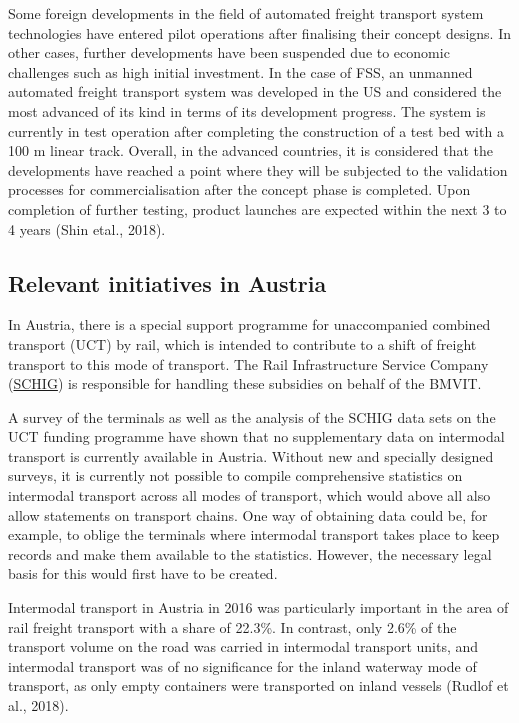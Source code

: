 \documentclass[
]{book}
\begin{document}
Some foreign developments in the field of automated freight transport system technologies have entered pilot operations after finalising their concept designs. In other cases, further developments have been suspended due to economic challenges such as high initial investment. In the case of FSS, an unmanned automated freight transport system was developed in the US and considered the most advanced of its kind in terms of its development progress. The system is currently in test operation after completing the construction of a test bed with a 100 m linear track. Overall, in the advanced countries, it is considered that the developments have reached a point where they will be subjected to the validation processes for commercialisation after the concept phase is completed. Upon completion of further testing, product launches are expected within the next 3 to 4 years (Shin etal., 2018).

\hypertarget{relevant-initiatives-in-austria-22}{%
\subsection*{Relevant initiatives in Austria}\label{relevant-initiatives-in-austria-22}}

In Austria, there is a special support programme for unaccompanied combined transport (UCT) by rail, which is intended to contribute to a shift of freight transport to this mode of transport. The Rail Infrastructure Service Company (\href{https://www.schig.com/}{SCHIG}) is responsible for handling these subsidies on behalf of the BMVIT.

A survey of the terminals as well as the analysis of the SCHIG data sets on the UCT funding programme have shown that no supplementary data on intermodal transport is currently available in Austria. Without new and specially designed surveys, it is currently not possible to compile comprehensive statistics on intermodal transport across all modes of transport, which would above all also allow statements on transport chains. One way of obtaining data could be, for example, to oblige the terminals where intermodal transport takes place to keep records and make them available to the statistics. However, the necessary legal basis for this would first have to be created.

Intermodal transport in Austria in 2016 was particularly important in the area of rail freight transport with a share of 22.3\%. In contrast, only 2.6\% of the transport volume on the road was carried in intermodal transport units, and intermodal transport was of no significance for the inland waterway mode of transport, as only empty containers were transported on inland vessels (Rudlof et al., 2018).
\end{document}
